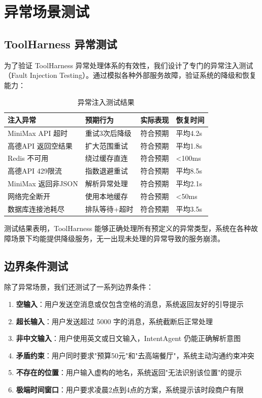 \documentclass[12pt,a4paper]{ctexart}
\begin{document}
\section{异常场景测试}

\subsection{ToolHarness 异常测试}

为了验证 ToolHarness 异常处理体系的有效性，我们设计了专门的异常注入测试（Fault Injection Testing）。通过模拟各种外部服务故障，验证系统的降级和恢复能力：

\begin{table}[H]
\centering
\caption{异常注入测试结果}
\label{tab:fault-injection}
\renewcommand{\arraystretch}{1.3}
{\small
\begin{tabular}{p{3.5cm} p{2.5cm} p{2.5cm} p{3.5cm}}
\toprule
\textbf{注入异常} & \textbf{预期行为} & \textbf{实际表现} & \textbf{恢复时间} \\
\midrule
MiniMax API 超时 & 重试3次后降级 & 符合预期 & 平均4.2s \\
高德API 返回空结果 & 扩大范围重试 & 符合预期 & 平均1.8s \\
Redis 不可用 & 绕过缓存直连 & 符合预期 & <100ms \\
高德API 429限流 & 指数退避重试 & 符合预期 & 平均8.5s \\
MiniMax 返回非JSON & 解析异常处理 & 符合预期 & 平均2.1s \\
网络完全断开 & 使用本地缓存 & 符合预期 & <50ms \\
数据库连接池耗尽 & 排队等待+超时 & 符合预期 & 平均3.5s \\
\bottomrule
\end{tabular}
}
\end{table}

测试结果表明，ToolHarness 能够正确处理所有预定义的异常类型，系统在各种故障场景下均能提供降级服务，无一出现未处理的异常导致的服务崩溃。

\subsection{边界条件测试}

除了异常场景，我们还测试了一系列边界条件：

\begin{enumerate}[leftmargin=2em]
  \item \textbf{空输入}：用户发送空消息或仅包含空格的消息，系统返回友好的引导提示
  \item \textbf{超长输入}：用户发送超过 5000 字的消息，系统截断后正常处理
  \item \textbf{非中文输入}：用户使用英文或日文输入，IntentAgent 仍能正确解析意图
  \item \textbf{矛盾约束}：用户同时要求"预算50元"和"去高端餐厅"，系统主动沟通约束冲突
  \item \textbf{不存在的位置}：用户输入虚构的地名，系统返回"无法识别该位置"的提示
  \item \textbf{极端时间窗口}：用户要求凌晨2点到4点的方案，系统提示该时段商户有限
\end{enumerate}
\end{document}
